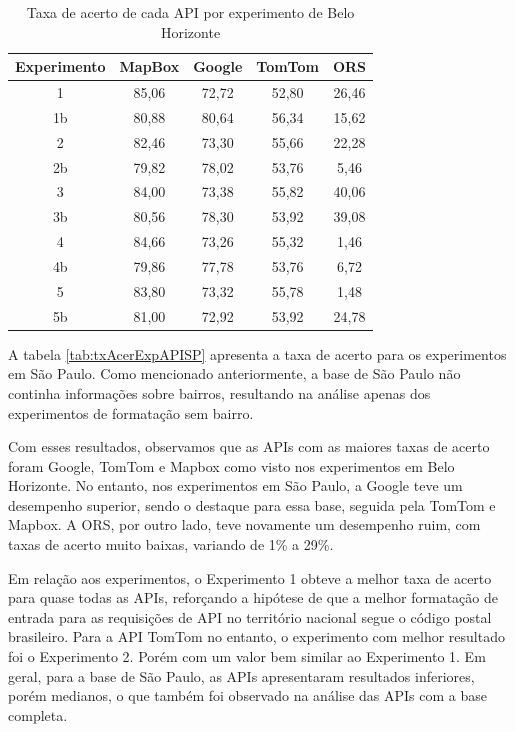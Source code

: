 \begin{table}[!ht]
    \centering
    \caption{Taxa de acerto de cada API por experimento de Belo Horizonte}
    \label{tab:txAcerExpAPIBH}
    \begin{adjustbox}{width=0.7\textwidth}
    \begin{tabular}{|c|c|c|c|c|}
    \hline
    Experimento & MapBox & Google & TomTom & ORS\\
    \hline
    1 & 85,06 & 72,72 & 52,80 & 26,46\\
    \hline
    1b & 80,88 & 80,64 & 56,34 & 15,62\\
    \hline
    2 & 82,46 & 73,30 & 55,66 & 22,28\\
    \hline
    2b & 79,82 & 78,02 & 53,76 & 5,46\\
    \hline
    3 & 84,00 & 73,38 & 55,82 & 40,06\\
    \hline
    3b & 80,56 & 78,30 & 53,92 & 39,08\\
    \hline
    4 & 84,66 & 73,26 & 55,32 & 1,46\\
    \hline
    4b & 79,86 & 77,78 & 53,76 & 6,72\\
    \hline
    5 & 83,80 & 73,32 & 55,78 & 1,48\\
    \hline
    5b & 81,00 & 72,92 & 53,92 & 24,78\\
    \hline
    \end{tabular}
    \end{adjustbox}
\end{table}

A tabela \ref{tab:txAcerExpAPISP} apresenta a taxa de acerto para os experimentos em São Paulo. Como mencionado anteriormente, a base de São Paulo não continha informações sobre bairros, resultando na análise apenas dos experimentos de formatação sem bairro.

Com esses resultados, observamos que as APIs com as maiores taxas de acerto foram Google, TomTom e Mapbox como visto nos experimentos em Belo Horizonte. No entanto, nos experimentos em São Paulo, a Google teve um desempenho superior, sendo o destaque para essa base, seguida pela TomTom e Mapbox. A ORS, por outro lado, teve novamente um desempenho ruim, com taxas de acerto muito baixas, variando de 1\% a 29\%.

Em relação aos experimentos, o Experimento 1 obteve a melhor taxa de acerto para quase todas as APIs, reforçando a hipótese de que a melhor formatação de entrada para as requisições de API no território nacional segue o código postal brasileiro. Para a API TomTom no entanto, o experimento com melhor resultado foi o Experimento 2. Porém com um valor bem similar ao Experimento 1. Em geral, para a base de São Paulo, as APIs apresentaram resultados inferiores, porém medianos, o que também foi observado na análise das APIs com a base completa.


